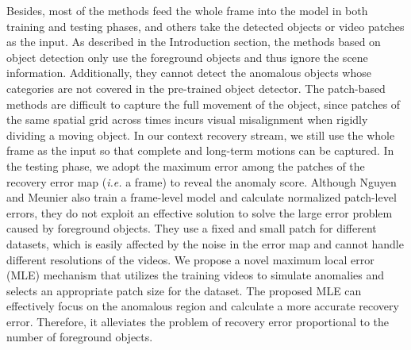 \documentclass[lettersize,journal]{IEEEtran}
\begin{document}
Besides, most of the methods feed the whole frame into the model in both training and testing phases, and others take the detected objects \cite{HybridVideo2021liua, BackgroundAgnosticFramework2021georgescua, ClozeTest2020yu, AnomalyDetection2021georgescua, ObjectCentricAutoEncoders2019ionescua} or video patches \cite{DeepCascadeCascading2017sabokroua, StreetScene2020ramachandraa, LearningDistance2020ramachandraa} as the input.
As described in the Introduction section, the methods based on object detection only use the foreground objects and thus ignore the scene information.
Additionally, they cannot detect the anomalous objects whose categories are not covered in the pre-trained object detector.
The patch-based methods are difficult to capture the full movement of the object, since patches of the same spatial grid across times incurs visual misalignment when rigidly dividing a moving object.
In our context recovery stream, we still use the whole frame as the input so that complete and long-term motions can be captured.
In the testing phase, we adopt the maximum error among the patches of the recovery error map (\textit{i.e.} a frame) to reveal the anomaly score.
Although Nguyen and Meunier \cite{AnomalyDetection2019nguyena} also train a frame-level model and calculate normalized patch-level errors, they do not exploit an effective solution to solve the large error problem caused by foreground objects.
They use a fixed and small patch for different datasets, which is easily affected by the noise in the error map and cannot handle different resolutions of the videos.
We propose a novel maximum local error (MLE) mechanism that utilizes the training videos to simulate anomalies and selects an appropriate patch size for the dataset.
The proposed MLE can effectively focus on the anomalous region and calculate a more accurate recovery error.
Therefore, it alleviates the problem of recovery error proportional to the number of foreground objects.
\end{document}
